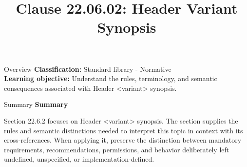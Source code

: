 \documentclass[10pt,letterpaper]{article}
\title{Clause 22.06.02: Header Variant Synopsis}
\author{}
\date{}
\begin{document}
\maketitle
\begin{CornellOverviewBox}{Overview}
\textbf{Classification:} Standard library - Normative\\[2pt]
\textbf{Learning objective:} Understand the rules, terminology, and semantic consequences associated with Header <variant> synopsis.
\end{CornellOverviewBox}\begin{CornellSummaryBox}{Summary}
{\sffamily\bfseries\color{Accent} Summary}\par\vspace{3pt}Section 22.6.2 focuses on Header <variant> synopsis. The section supplies the rules and semantic distinctions needed to interpret this topic in context with its cross-references. When applying it, preserve the distinction between mandatory requirements, recommendations, permissions, and behavior deliberately left undefined, unspecified, or implementation-defined.
\end{CornellSummaryBox}
\end{document}
